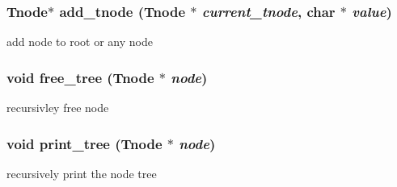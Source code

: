 \subsubsection{\setlength{\rightskip}{0pt plus 5cm}\bf{Tnode}$\ast$ add\_\-tnode (\bf{Tnode} $\ast$ {\em current\_\-tnode}, char $\ast$ {\em value})}\label{node_8h_0e09ab427d9f10182d2261a14b349f66}


add node to root or any node 
\subsubsection{\setlength{\rightskip}{0pt plus 5cm}void free\_\-tree (\bf{Tnode} $\ast$ {\em node})}\label{node_8h_76da80f6d3efba75651334442a1d63ee}


recursivley free node 
\subsubsection{\setlength{\rightskip}{0pt plus 5cm}void print\_\-tree (\bf{Tnode} $\ast$ {\em node})}\label{node_8h_243ce048ff7b497dd9f97f689d14e919}


recursively print the node tree 